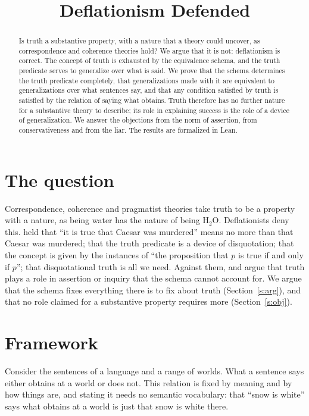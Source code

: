 \documentclass{situationist-preprint}
\title{Deflationism Defended}
\begin{document}
\maketitle

\begin{abstract}
Is truth a substantive property, with a nature that a theory could uncover, as correspondence and coherence theories hold? We argue that it is not: deflationism is correct. The concept of truth is exhausted by the equivalence schema, and the truth predicate serves to generalize over what is said. We prove that the schema determines the truth predicate completely, that generalizations made with it are equivalent to generalizations over what sentences say, and that any condition satisfied by truth is satisfied by the relation of saying what obtains. Truth therefore has no further nature for a substantive theory to describe; its role in explaining success is the role of a device of generalization. We answer the objections from the norm of assertion, from conservativeness and from the liar. The results are formalized in Lean.
\end{abstract}

\section{The question}

Correspondence, coherence and pragmatist theories take truth to be a property with a nature, as being water has the nature of being $\mathrm{H}_2\mathrm{O}$. Deflationists deny this. \citet{Ramsey1927} held that \enquote{it is true that Caesar was murdered} means no more than that Caesar was murdered; \citet{Quine1970} that the truth predicate is a device of disquotation; \citet{Horwich1998} that the concept is given by the instances of \enquote{the proposition that $p$ is true if and only if $p$}; \citet{Field1994} that disquotational truth is all we need. Against them, \citet{Dummett1959} and \citet{Wright1992} argue that truth plays a role in assertion or inquiry that the schema cannot account for. We argue that the schema fixes everything there is to fix about truth (Section~\ref{s:arg}), and that no role claimed for a substantive property requires more (Section~\ref{s:obj}).

\section{Framework}

\begin{definition}\label{d:frame}
Consider the sentences of a language and a range of worlds. What a sentence says either obtains at a world or does not. This relation is fixed by meaning and by how things are, and stating it needs no semantic vocabulary: that \enquote{snow is white} says what obtains at a world is just that snow is white there.
\end{definition}
\end{document}
